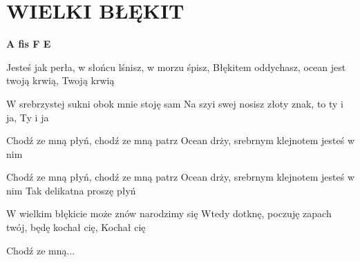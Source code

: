 \documentclass[../../../songbook.tex]{subfiles}
\begin{document}
\TabPositions{9cm} %
\section*{WIELKI BŁĘKIT}
{}
\vspace{0.5cm}
{\color{red}\textbf{A fis F E} } \newline

Jesteś jak perła, w słońcu lśnisz, w morzu śpisz,     \newline
Błękitem oddychasz, ocean jest twoją krwią,         \newline
Twoją krwią                                          \newline      

W srebrzystej sukni obok mnie stoję sam				 \newline
Na szyi swej nosisz złoty znak, to ty i ja, 			 \newline
Ty i ja			 \newline

\-\hspace{1cm} Chodź ze mną płyń, chodź ze mną patrz                \newline
\-\hspace{1cm} Ocean drży, srebrnym klejnotem jesteś w nim           \newline

\-\hspace{1cm} Chodź ze mną płyń, chodź ze mną patrz              \newline
\-\hspace{1cm} Ocean drży, srebrnym klejnotem jesteś w nim   	 \newline
\-\hspace{1cm} Tak delikatna proszę płyń                          \newline

W wielkim błękicie może znów narodzimy się			 \newline
Wtedy dotknę, poczuję zapach twój, będę kochał cię,			 \newline
Kochał cię		 \newline

\-\hspace{1cm} Chodź ze mną...			 \newline
\end{document}

